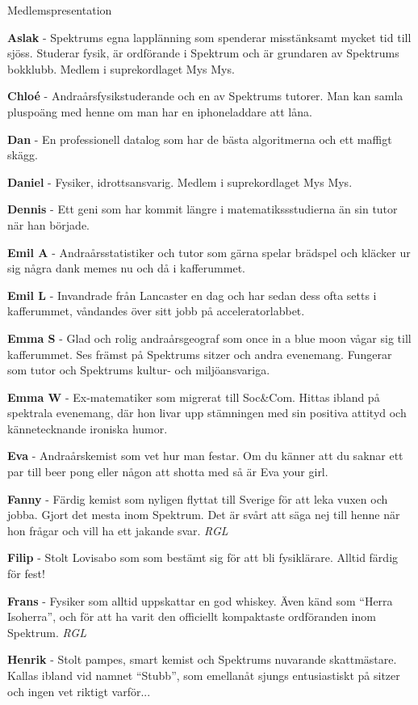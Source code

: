 \documentclass{spektraklet}
\begin{document}
\begin{artikel}{Medlemspresentation}{}
\begin{twocolumns}
\textbf{Aslak} - Spektrums egna lapplänning som spenderar misstänksamt mycket tid till sjöss. Studerar fysik, är ordförande i Spektrum och är grundaren av Spektrums bokklubb. Medlem i suprekordlaget Mys Mys.

\textbf{Chloé} - Andraårsfysikstuderande och en av Spektrums tutorer. Man kan samla pluspoäng med henne om man har en iphoneladdare att låna.

\textbf{Dan} - En professionell datalog som har de bästa algoritmerna och ett maffigt skägg. 

\textbf{Daniel} - Fysiker, idrottsansvarig. Medlem i suprekordlaget Mys Mys.

\textbf{Dennis} - Ett geni som har kommit längre i matematikssstudierna än sin tutor när han började.

\textbf{Emil A} - Andraårsstatistiker och tutor som gärna spelar brädspel och kläcker ur sig några dank memes nu och då i kafferummet.

\textbf{Emil L} - Invandrade från Lancaster en dag och har sedan dess ofta setts i kafferummet, våndandes över sitt jobb på acceleratorlabbet.

\textbf{Emma S} - Glad och rolig andraårsgeograf som once in a blue moon vågar sig till kafferummet. Ses främst på Spektrums sitzer och andra evenemang. Fungerar som tutor och Spektrums kultur- och miljöansvariga.

\textbf{Emma W} - Ex-matematiker som migrerat till Soc\&Com. Hittas ibland på spektrala evenemang, där hon livar upp stämningen med sin positiva attityd och kännetecknande ironiska humor. %

\textbf{Eva} - Andraårskemist som vet hur man festar. Om du känner att du saknar ett par till beer pong eller någon att shotta med så är Eva your girl.

\textbf{Fanny} - Färdig kemist som nyligen flyttat till Sverige för att leka vuxen och jobba. Gjort det mesta inom Spektrum. Det är svårt att säga nej till henne när hon frågar och vill ha ett jakande svar. \emph{RGL} %

\textbf{Filip} - Stolt Lovisabo som som bestämt sig för att bli fysiklärare. Alltid färdig för fest! %

\textbf{Frans} - Fysiker som alltid uppskattar en god whiskey. Även känd som ``Herra Isoherra'', och för att ha varit den officiellt kompaktaste ordföranden inom Spektrum. \emph{RGL}

\textbf{Henrik} - Stolt pampes, smart kemist och Spektrums nuvarande skattmästare. Kallas ibland vid namnet “Stubb”, som emellanåt sjungs entusiastiskt på sitzer och ingen vet riktigt varför... 


\end{twocolumns}
\end{artikel}
\end{document}
